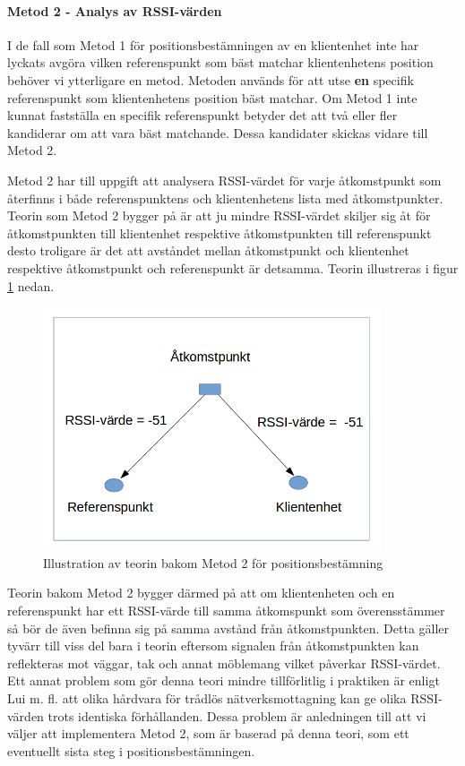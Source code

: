 \documentclass[a4paper,12pt]{article}
\begin{document}
 \paragraph{Metod 2 - Analys av RSSI-värden}
 \leavevmode\newline
 I de fall som Metod 1 för positionsbestämningen av en klientenhet inte har lyckats avgöra vilken referenspunkt som bäst matchar klientenhetens position behöver vi ytterligare en metod. Metoden används för att utse \textbf{en} specifik referenspunkt som klientenhetens position bäst matchar. Om Metod 1 inte kunnat fastställa en specifik referenspunkt betyder det att två eller fler kandiderar om att vara bäst matchande. Dessa kandidater skickas vidare till Metod 2.

 Metod 2 har till uppgift att analysera RSSI-värdet för varje åtkomstpunkt som återfinns i både referenspunktens och klientenhetens lista med åtkomstpunkter.
 Teorin som Metod 2 bygger på är att ju mindre RSSI-värdet skiljer sig åt för åtkomstpunkten till klientenhet respektive åtkomstpunkten till referenspunkt desto troligare är det att avståndet mellan åtkomstpunkt och klientenhet respektive åtkomstpunkt och referenspunkt är detsamma. Teorin illustreras i figur \ref{fig:TEO2} nedan.

 \begin{figure}[H]
   \centering
   \includegraphics[width=10cm]{media/TeoriMetod2.png}
   \caption{Illustration av teorin bakom Metod 2 för positionsbestämning}
   \label{fig:TEO2}
 \end{figure}

 Teorin bakom Metod 2 bygger därmed på att om klientenheten och en referenspunkt har ett RSSI-värde till samma åtkomspunkt som överensstämmer så bör de även befinna sig på samma avstånd från åtkomstpunkten. Detta gäller tyvärr till viss del bara i teorin eftersom signalen från åtkomstpunkten kan reflekteras mot väggar, tak och annat möblemang vilket påverkar RSSI-värdet\cite{zanca2008experimental}. Ett annat problem som gör denna teori mindre tillförlitlig i praktiken är enligt Lui m. fl. att olika hårdvara för trådlös nätverksmottagning kan ge olika RSSI-värden trots identiska förhållanden\cite{problem_with_RSSI}. Dessa problem är anledningen till att vi väljer att implementera Metod 2, som är baserad på denna teori, som ett eventuellt sista steg i positionsbestämningen.
\end{document}
